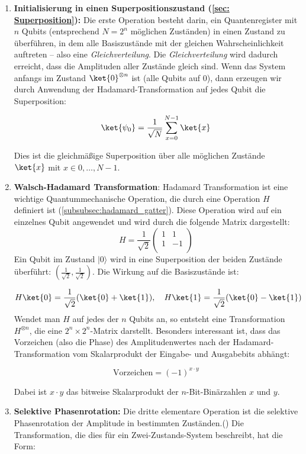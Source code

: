 \begin{enumerate}
    \item \textbf{Initialisierung in einen Superpositionszustand (\ref{sec: Superposition}):} 
    Die erste Operation besteht darin, ein Quantenregister mit $n$ Qubits (entsprechend $N = 2^{n}$ möglichen Zuständen) in einen Zustand zu überführen, in dem alle Basiszustände mit der gleichen Wahrscheinlichkeit auftreten – also eine \textit{Gleichverteilung}. Die \textit{Gleichverteilung} wird dadurch erreicht, dass die Amplituden aller Zustände gleich sind. Wenn das System anfangs im Zustand $\ket{0}^{\otimes n}$ ist (alle Qubits auf 0), dann erzeugen wir durch Anwendung der Hadamard-Transformation auf jedes Qubit die Superposition:

$$
\ket{\psi_0} = \frac{1}{\sqrt{N}} \sum_{x=0}^{N-1} \ket{x}
$$

Dies ist die gleichmäßige Superposition über alle möglichen Zustände $\ket{x}$ mit $x \in {0, \ldots, N-1}$.\\
    \item \textbf{Walsch-Hadamard Transformation}: Hadamard Transformation ist eine wichtige Quantummechanische Operation, die durch eine Operation $H$ definiert ist (\ref{subsubsec:hadamard_gatter}). Diese Operation wird auf ein einzelnes Qubit angewendet und wird durch die folgende Matrix dargestellt:
    $$
H = \frac{1}{\sqrt{2}} \begin{pmatrix}
1 & 1 \\
1 & -1 \\
\end{pmatrix}
$$
Ein Qubit im Zustand \( \lvert 0 \rangle \) wird in eine Superposition der beiden Zustände überführt: \( \left( \frac{1}{\sqrt{2}}, \frac{1}{\sqrt{2}} \right) \). Die Wirkung auf die Basiszustände ist:

$$
H\ket{0} = \frac{1}{\sqrt{2}}(\ket{0} + \ket{1}), \quad H\ket{1} = \frac{1}{\sqrt{2}}(\ket{0} - \ket{1})
$$
Wendet man $H$ auf jedes der $n$ Qubits an, so entsteht eine Transformation $H^{\otimes n}$, die eine $2^n \times 2^n$-Matrix darstellt.
Besonders interessant ist, dass das Vorzeichen (also die Phase) des Amplitudenwertes nach der Hadamard-Transformation vom Skalarprodukt der Eingabe- und Ausgabebits abhängt:

$$
\text{Vorzeichen} = (-1)^{x \cdot y}
$$

Dabei ist $x \cdot y$ das bitweise Skalarprodukt der $n$-Bit-Binärzahlen $x$ und $y$.\\

    \item \textbf{Selektive Phasenrotation:} Die dritte elementare Operation ist die selektive Phasenrotation der Amplitude in bestimmten Zuständen.(\cite{zotero-1211}) Die Transformation, die dies für ein Zwei-Zustands-System beschreibt, hat die Form:


\end{enumerate}
